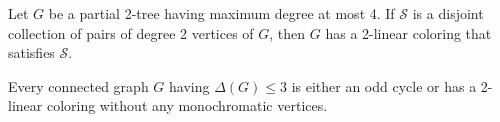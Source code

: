 \begin{theorem}\label{thm:p2tree}
Let $G$ be a partial 2-tree having maximum degree at most 4.
If $\mathcal{S}$ is a disjoint collection of pairs of degree 2 vertices of $G$,
then $G$ has a 2-linear coloring that satisfies $\mathcal{S}$.
\end{theorem}

\begin{theorem}\label{thm:3dg3}
Every connected graph $G$ having $\Delta(G)\leq 3$ is either an odd cycle or has a 2-linear coloring without any monochromatic vertices.
\end{theorem}
